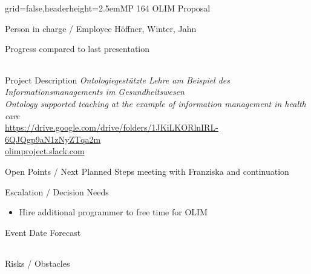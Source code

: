 \documentclass[english]{kiesgrube}
\begin{document}
\begin{poster}{grid=false,headerheight=2.5em}{}{MP 164 OLIM Proposal}{}{}
\begin{posterbox}[name=person,column=0,row=0]{Person in charge / Employee}
Höffner, Winter, Jahn
\end{posterbox}
\begin{posterbox}[name=progress,below=person]{Progress compared to last presentation}
\begin{tabulary}{\textwidth}{lL}
\end{tabulary}
\end{posterbox}
\begin{posterbox}[name=description,column=1,row=0]{Project Description}
\emph{Ontologiegestützte Lehre am Beispiel des Informationsmanagements im Gesundheitswesen}\\
\emph{Ontology supported teaching at the example of information management in health care}\\
\url{https://drive.google.com/drive/folders/1JKiLKORlnIRL-6QJQgp9aN1zNyZTqa2m}\\
\url{olimproject.slack.com}
\end{posterbox}
\begin{posterbox}[name=open,column=1,below=description]{Open Points / Next Planned Steps}
meeting with Franziska and continuation
\end{posterbox}
\begin{posterbox}[name=escalation,column=1,below=open]{Escalation / Decision Needs}
\begin{itemize}
\item Hire additional programmer to free time for OLIM
\end{itemize}
\end{posterbox}
\begin{posterbox}[name=event,below=progress,]{Event Date Forecast}
\begin{tabulary}{\textwidth}{lL}
\end{tabulary}
\end{posterbox}
\begin{posterbox}[name=event,below=event]{Risks / Obstacles}
\end{posterbox}
\footer{}
\end{poster}
\end{document}
